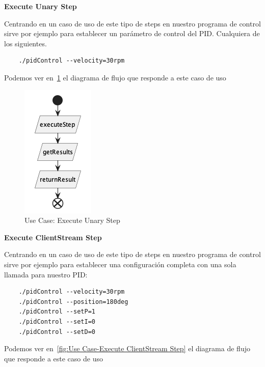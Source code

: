 \textbf{Execute Unary Step}

Centrando en un caso de uso de este tipo de steps en nuestro programa de control sirve por ejemplo para establecer un parámetro de control del PID. Cualquiera de los siguientes.

\begin{verbatim}
    ./pidControl --velocity=30rpm
\end{verbatim}

Podemos ver en~\cref{fig:Use Case-Execute Unary Step} el diagrama de flujo que responde a este caso de uso

\begin{figure}[H]
    \centering
    \includegraphics[height=0.2\textheight]{./part/Proyecto_ejecutivo/memoria_descriptiva/descripcionDelProyecto/client/uml/executeUnaryStep}
    \caption{Use Case: Execute Unary Step}\label{fig:Use Case-Execute Unary Step}
\end{figure}

\textbf{Execute ClientStream Step}

Centrando en un caso de uso de este tipo de steps en nuestro programa de control sirve por ejemplo para establecer una configuración completa con una sola llamada para nuestro PID:
\begin{verbatim}
    ./pidControl --velocity=30rpm
    ./pidControl --position=180deg
    ./pidControl --setP=1
    ./pidControl --setI=0
    ./pidControl --setD=0
\end{verbatim}

Podemos ver en~\cref{fig:Use Case-Execute ClientStream Step} el diagrama de flujo que responde a este caso de uso

